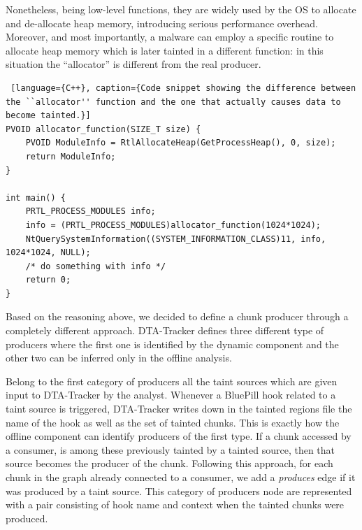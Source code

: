 \documentclass[LaM,binding=0.6cm]{sapthesis}
\begin{document}
Nonetheless, being low-level functions, they are widely used by the OS to allocate and de-allocate heap memory, introducing serious performance overhead. Moreover, and most importantly, a malware can employ a specific routine to allocate heap memory which is later tainted in a different function: in this situation the ``allocator'' is different from the real producer.

\begin{lstlisting} [language={C++}, caption={Code snippet showing the difference between the ``allocator'' function and the one that actually causes data to become tainted.}]
PVOID allocator_function(SIZE_T size) {
	PVOID ModuleInfo = RtlAllocateHeap(GetProcessHeap(), 0, size);
	return ModuleInfo;
}

int main() {
	PRTL_PROCESS_MODULES info;
	info = (PRTL_PROCESS_MODULES)allocator_function(1024*1024);
	NtQuerySystemInformation((SYSTEM_INFORMATION_CLASS)11, info, 1024*1024, NULL);
	/* do something with info */
	return 0;
}
\end{lstlisting}

\noindent
Based on the reasoning above, we decided to define a chunk producer through a completely different approach. {\sf DTA-Tracker} defines three different type of producers where the first one is identified by the dynamic component and the other two can be inferred only in the offline analysis.

Belong to the first category of producers all the taint sources which are given input to {\sf DTA-Tracker} by the analyst. Whenever a BluePill hook related to a taint source is triggered, {\sf DTA-Tracker} writes down in the tainted regions file the name of the hook as well as the set of tainted chunks. This is exactly how the offline component can identify producers of the first type. If a chunk accessed by a consumer, is among these previously tainted by a tainted source, then that source becomes the producer of the chunk. Following this approach, for each chunk in the graph already connected to a consumer, we add a \textit{produces} edge if it was produced by a taint source. This category of producers node are represented with a pair consisting of hook name and context when the tainted chunks were produced.\\
\end{document}
